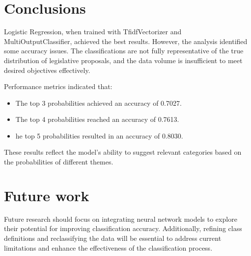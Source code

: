 \documentclass[12pt]{article}
\begin{document}
\section{Conclusions}

Logistic Regression, when trained with TfidfVectorizer and MultiOutputClassifier, achieved the best results. However, the analysis identified some accuracy issues. The classifications are not fully representative of the true distribution of legislative proposals, and the data volume is insufficient to meet desired objectives effectively.

Performance metrics indicated that:

\begin{itemize}
	\item The top 3 probabilities achieved an accuracy of 0.7027.
	\item The top 4 probabilities reached an accuracy of 0.7613.
	\item he top 5 probabilities resulted in an accuracy of 0.8030.
\end{itemize}

These results reflect the model's ability to suggest relevant categories based on the probabilities of different themes.

\section{Future work}


Future research should focus on integrating neural network models to explore their potential for improving classification accuracy. Additionally, refining class definitions and reclassifying the data will be essential to address current limitations and enhance the effectiveness of the classification process.

	
%	
%	
	
\end{document}
